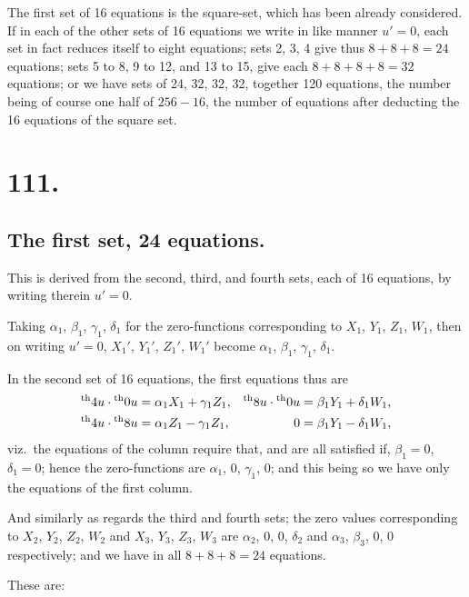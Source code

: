 \documentclass[11pt,a4paper]{book}
\providecommand{\uth}{\textsuperscript{th}}
\begin{document}
The first set of 16 equations is the square-set, which has been already considered. If in each of the other sets of 16 equations we write in like manner $u' = 0$, each set in fact reduces itself to eight equations; sets 2, 3, 4 give thus $8 + 8 + 8 = 24$ equations; sets 5 to 8, 9 to 12, and 13 to 15, give each $8 + 8 + 8 + 8 = 32$ equations; or we have sets of 24, 32, 32, 32, together 120 equations, the number being of course one half of $256 - 16$, the number of equations after deducting the 16 equations of the square set.

\newpage
\section*{111.}
\label{sec:111}

\subsection*{The first set, 24 equations.}

This is derived from the second, third, and fourth sets, each of 16 equations, by writing therein $u' = 0$.

Taking $\alpha_1$, $\beta_1$, $\gamma_1$, $\delta_1$ for the zero-functions corresponding to $X_1$, $Y_1$, $Z_1$, $W_1$, then on writing $u' = 0$, $X_1'$, $Y_1'$, $Z_1'$, $W_1'$ become $\alpha_1$, $\beta_1$, $\gamma_1$, $\delta_1$.

In the second set of 16 equations, the first equations thus are
\begin{align*}
\uth{4}u \cdot \uth{0}u &= \alpha_1 X_1 + \gamma_1 Z_1, & \uth{8}u \cdot \uth{0}u &= \beta_1 Y_1 + \delta_1 W_1, \\
\uth{4}u \cdot \uth{8}u &= \alpha_1 Z_1 - \gamma_1 Z_1, & 0 &= \beta_1 Y_1 - \delta_1 W_1,
\end{align*}
viz.\ the equations of the column require that, and are all satisfied if, $\beta_1 = 0$, $\delta_1 = 0$; hence the zero-functions are $\alpha_1$, $0$, $\gamma_1$, $0$; and this being so we have only the equations of the first column.

And similarly as regards the third and fourth sets; the zero values corresponding to $X_2$, $Y_2$, $Z_2$, $W_2$ and $X_3$, $Y_3$, $Z_3$, $W_3$ are $\alpha_2$, $0$, $0$, $\delta_2$ and $\alpha_3$, $\beta_3$, $0$, $0$ respectively; and we have in all $8 + 8 + 8 = 24$ equations.

These are:
\end{document}
